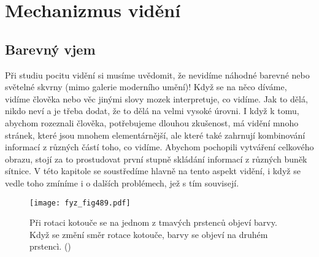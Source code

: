 \setchaptertoc
\chapter{Mechanizmus vidění}\label{fyz:IchapXXXVI}
  \section{Barevný vjem}\label{fyz:IchapXXXVIsecI}
    Při studiu pocitu vidění si musíme uvědomit, že nevidíme náhodné barevné nebo světelné skvrny
    (mimo galerie moderního umění)! Když se na něco díváme, vidíme člověka nebo věc jinými slovy
    mozek interpretuje, co vidíme. Jak to dělá, nikdo neví a je třeba dodat, že to dělá na velmi
    vysoké úrovni. I když k tomu, abychom rozeznali člověka, potřebujeme dlouhou zkušenost, má
    vidění mnoho stránek, které jsou mnohem elementárnější, ale které také zahrnují kombinování
    informací z různých částí toho, co vidíme. Abychom pochopili vytváření celkového obrazu, stojí
    za to prostudovat první stupně skládání informací z různých buněk sítnice. V této kapitole se
    soustředíme hlavně na tento aspekt vidění, i když se vedle toho zmíníme i o dalších problémech,
    jež s tím souvisejí.

    \begin{figure}[ht!] %
      \centering
      \texttt{[image: fyz\_fig489.pdf]}
      \caption{Při rotaci kotouče se na jednom z tmavých prstenců objeví barvy. Když se změní směr
        rotace kotouče, barvy se objeví na druhém prstencì. (\cite[s.~697]{Feynman01})}
      \label{fyz:fig489}
    \end{figure}

